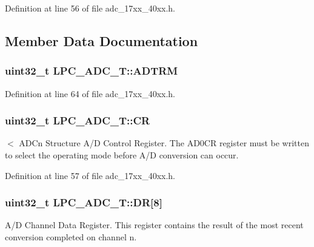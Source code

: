 Definition at line 56 of file adc\+\_\+17xx\+\_\+40xx.\+h.



\subsection{Member Data Documentation}
\subsubsection[{\texorpdfstring{A\+D\+T\+RM}{ADTRM}}]{ uint32\+\_\+t L\+P\+C\+\_\+\+A\+D\+C\+\_\+\+T\+::\+A\+D\+T\+RM}\hypertarget{structLPC__ADC__T_a22f04dd0b40c5a05707c0b1e43bd10bd}{}\label{structLPC__ADC__T_a22f04dd0b40c5a05707c0b1e43bd10bd}


Definition at line 64 of file adc\+\_\+17xx\+\_\+40xx.\+h.

\subsubsection[{\texorpdfstring{CR}{CR}}]{ uint32\+\_\+t L\+P\+C\+\_\+\+A\+D\+C\+\_\+\+T\+::\+CR}\hypertarget{structLPC__ADC__T_a751f1cbdd3d5242aea596dc18113fedc}{}\label{structLPC__ADC__T_a751f1cbdd3d5242aea596dc18113fedc}
$<$ A\+D\+Cn Structure A/D Control Register. The A\+D0\+CR register must be written to select the operating mode before A/D conversion can occur. 

Definition at line 57 of file adc\+\_\+17xx\+\_\+40xx.\+h.

\subsubsection[{\texorpdfstring{DR}{DR}}]{ uint32\+\_\+t L\+P\+C\+\_\+\+A\+D\+C\+\_\+\+T\+::\+DR\mbox{[}8\mbox{]}}\hypertarget{structLPC__ADC__T_a10f521f172d10766bb189be671f8bd57}{}\label{structLPC__ADC__T_a10f521f172d10766bb189be671f8bd57}
A/D Channel Data Register. This register contains the result of the most recent conversion completed on channel n. 

